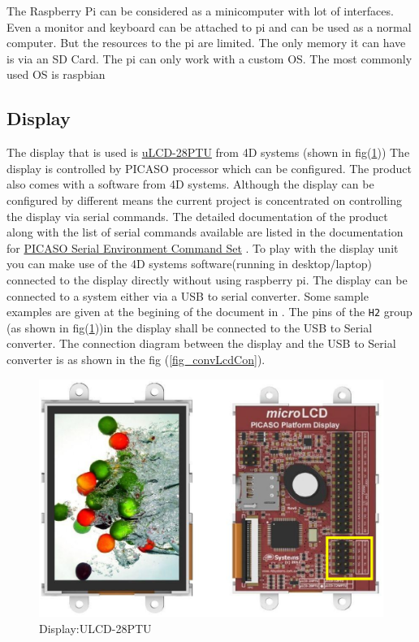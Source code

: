 \documentclass[12pt, a4paper, twoside]{article}
\begin{document}
The Raspberry Pi can be considered as a minicomputer with lot of interfaces. Even a monitor and keyboard can be attached to pi and can be used as a normal computer. But the resources to the pi are limited. The only memory it can have is via an SD Card. The pi can only work with a custom OS. The most commonly used OS is raspbian \cite{bib_raspbian}

\subsection{Display}

The display that is used is \href{http://www.4dsystems.com.au/product/uLCD_28PTU/}{uLCD-28PTU} from 4D systems \cite{bib_ulcd} (shown in fig(\ref{fig_ulcd}))  The display is controlled by PICASO processor which can be configured. The product also comes with a software from 4D systems. Although the display can be configured by different means the current project is concentrated on controlling the display via serial commands. The detailed documentation of the product along with the list of serial commands available are listed in the documentation for \href{http://www.4dsystems.com.au/productpages/PICASO/downloads/PICASO_serialcmdmanual_R_2_0.pdf}{PICASO Serial Environment Command Set} \cite{bib_serulcd}. To play with the display unit you can make use of the 4D systems software(running in desktop/laptop) connected to the display directly without using raspberry pi. The display can be connected to a system either via a USB to serial converter. Some sample examples are given at the begining of the document in \cite{bib_serulcd}. The pins of the \texttt{H2} group (as shown in fig(\ref{fig_ulcd}))in the display shall be connected to the USB to Serial converter. The connection diagram between the display and the USB to Serial converter is as shown in the fig (\ref{fig_convLcdCon}).

\begin{figure}[ht]
    \centering
    \includegraphics[scale=0.7]{ulcd-28ptu.eps}
    \caption{Display:ULCD-28PTU}
    \label{fig_ulcd}
\end{figure}
\end{document}
